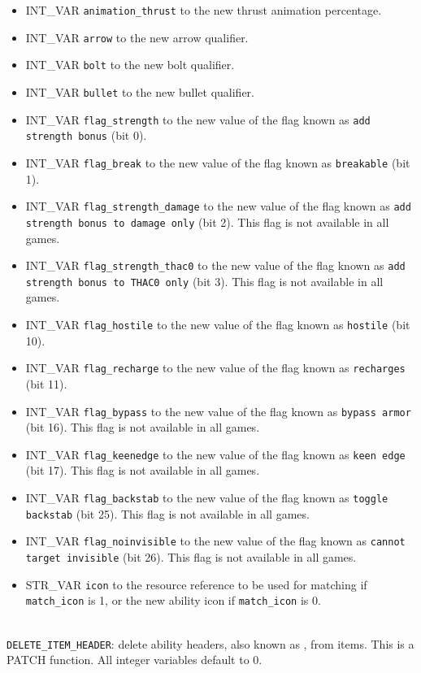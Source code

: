\documentclass{article}
\def\t#1{{\tt #1}}
\begin{document}
\begin{itemize}
\item INT_VAR \verb+animation_thrust+ to the new thrust animation percentage.
\item INT_VAR \verb+arrow+ to the new arrow qualifier.
\item INT_VAR \verb+bolt+ to the new bolt qualifier.
\item INT_VAR \verb+bullet+ to the new bullet qualifier.
\item INT_VAR \verb+flag_strength+ to the new value of the flag known as \t{add strength bonus} (bit 0).
\item INT_VAR \verb+flag_break+ to the new value of the flag known as \t{breakable} (bit 1).
\item INT_VAR \verb+flag_strength_damage+ to the new value of the flag known as \t{add strength bonus to damage only} (bit 2). This flag is not available in all games.
\item INT_VAR \verb+flag_strength_thac0+ to the new value of the flag known as \t{add strength bonus to THAC0 only} (bit 3). This flag is not available in all games.
\item INT_VAR \verb+flag_hostile+ to the new value of the flag known as \t{hostile} (bit 10).
\item INT_VAR \verb+flag_recharge+ to the new value of the flag known as \t{recharges} (bit 11).
\item INT_VAR \verb+flag_bypass+ to the new value of the flag known as \t{bypass armor} (bit 16). This flag is not available in all games.
\item INT_VAR \verb+flag_keenedge+ to the new value of the flag known as \t{keen edge} (bit 17). This flag is not available in all games.
\item INT_VAR \verb+flag_backstab+ to the new value of the flag known as \t{toggle backstab} (bit 25). This flag is not available in all games.
\item INT_VAR \verb+flag_noinvisible+ to the new value of the flag known as \t{cannot target invisible} (bit 26). This flag is not available in all games.
\item STR_VAR \verb+icon+ to the resource reference to be used for matching if \verb+match_icon+ is 1, or the new ability icon if \verb+match_icon+ is 0.
\end{itemize}
\\

\verb+DELETE_ITEM_HEADER+: delete ability headers, also known as , from items. This is a PATCH function. All integer variables default to 0.
\end{document}
